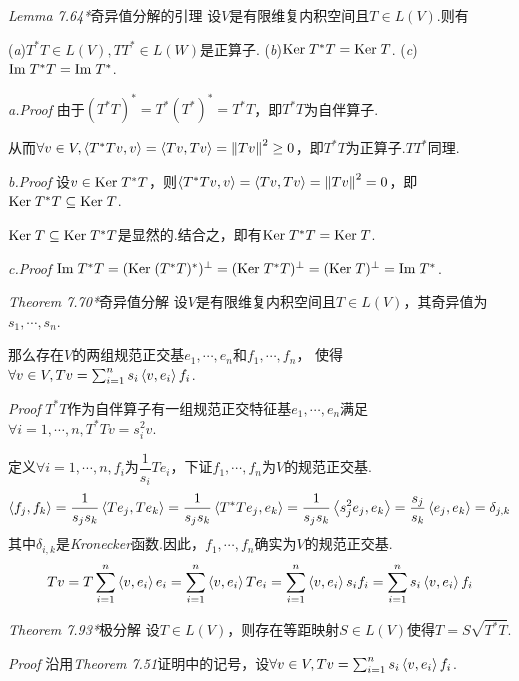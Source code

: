 \textit{Lemma 7.64*}{\kaishu 奇异值分解的引理}
设\(V\)是有限维复内积空间且\(T \in L(V)\).则有

(\textit{a})\(T^*T \in L(V),TT^* \in L(W)\)是正算子. \quad
(\textit{b})\(\mathrm{Ker \;} T^*T=\mathrm{Ker \;} T\). \quad 
(\textit{c})\(\mathrm{Im \;} T^*T=\mathrm{Im \;} T^*\).

\textit{a.Proof}
由于\((T^*T)^*=T^*(T^*)^*=T^*T\)，即\(T^*T\)为自伴算子.

从而\(\forall v \in V,\left\langle T^*Tv,v \right\rangle=\left\langle Tv,Tv \right\rangle=\left\lVert Tv \right\rVert^2 \geq 0\)，即\(T^*T\)为正算子.\(TT^*\)同理.

\textit{b.Proof}
设\(v \in \mathrm{Ker \;} T^*T\)，则\(\left\langle T^*Tv,v \right\rangle=\left\langle Tv,Tv \right\rangle=\left\lVert Tv \right\rVert^2=0\)，即\(\mathrm{Ker \;} T^*T \subseteq \mathrm{Ker \;} T\).

\(\mathrm{Ker \;} T \subseteq \mathrm{Ker \;} T^*T\)是显然的.结合之，即有\(\mathrm{Ker \;} T^*T=\mathrm{Ker \;} T\).

\textit{c.Proof}
\(\mathrm{Im \;} T^*T=(\mathrm{Ker \;} (T^*T)^*)^\bot=(\mathrm{Ker \;} T^*T)^\bot=(\mathrm{Ker \;} T)^\bot=\mathrm{Im \;} T^*\).

\hspace*{\fill}

\textit{Theorem 7.70*}{\kaishu 奇异值分解}
设\(V\)是有限维复内积空间且\(T \in L(V)\)，其奇异值为\(s_1,\cdots,s_n\).

那么存在\(V\)的两组规范正交基\(e_1,\cdots,e_n\)和\(f_1,\cdots,f_n\)，
使得\(\forall v \in V,Tv=\sum_{i=1}^n s_i\left\langle v,e_i \right\rangle f_i\).

\textit{Proof}
\(T^*T\)作为自伴算子有一组规范正交特征基\(e_1,\cdots,e_n\)满足\(\forall i=1,\cdots,n,T^*Tv=s_i^2 v\).

定义\(\forall i=1,\cdots,n,f_i\)为\(\dfrac{1}{s_i}Te_i\)，下证\(f_1,\cdots,f_n\)为\(V\)的规范正交基.
    \begin{align*}
        \left\langle f_j,f_k \right\rangle=\dfrac{1}{s_js_k}\left\langle Te_j,Te_k \right\rangle=\dfrac{1}{s_js_k}\left\langle T^*Te_j,e_k \right\rangle
        =\dfrac{1}{s_js_k}\left\langle s_j^2 e_j,e_k \right\rangle=\dfrac{s_j}{s_k}\left\langle e_j,e_k \right\rangle=\delta_{j,k}
    \end{align*}
其中\(\delta_{i,k}\)是\textit{Kronecker}函数.因此，\(f_1,\cdots,f_n\)确实为\(V\)的规范正交基.
    \begin{align*}
        Tv=T\sum_{i=1}^n \left\langle v,e_i \right\rangle e_i=\sum_{i=1}^n \left\langle v,e_i \right\rangle Te_i
        =\sum_{i=1}^n \left\langle v,e_i \right\rangle s_if_i=\sum_{i=1}^n s_i\left\langle v,e_i \right\rangle f_i
    \end{align*}

\hspace*{\fill}

\textit{Theorem 7.93*}{\kaishu 极分解}
设\(T \in L(V)\)，则存在等距映射\(S \in L(V)\)使得\(T=S\sqrt{T^*T}\).

\textit{Proof}
沿用\textit{Theorem 7.51}证明中的记号，设\(\forall v \in V,Tv=\sum_{i=1}^n s_i\left\langle v,e_i \right\rangle f_i\).

